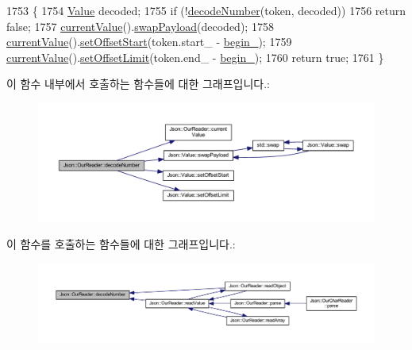 \begin{DoxyCode}
1753                                          \{
1754   \hyperlink{class_json_1_1_value}{Value} decoded;
1755   \textcolor{keywordflow}{if} (!\hyperlink{class_json_1_1_our_reader_a272d271290933a89abfd5096dd69c9e9}{decodeNumber}(token, decoded))
1756     \textcolor{keywordflow}{return} \textcolor{keyword}{false};
1757   \hyperlink{class_json_1_1_our_reader_a2acd5b1d53e7d7e17c21ff8e96edc09d}{currentValue}().\hyperlink{class_json_1_1_value_a5263476047f20e2fc6de470e4de34fe5}{swapPayload}(decoded);
1758   \hyperlink{class_json_1_1_our_reader_a2acd5b1d53e7d7e17c21ff8e96edc09d}{currentValue}().\hyperlink{class_json_1_1_value_a92e32ea0f4f8a15853a3cf0beac9feb9}{setOffsetStart}(token.start\_ - \hyperlink{class_json_1_1_our_reader_a9bda9d72335d52cd06e65f9eca3f70f5}{begin\_});
1759   \hyperlink{class_json_1_1_our_reader_a2acd5b1d53e7d7e17c21ff8e96edc09d}{currentValue}().\hyperlink{class_json_1_1_value_a5e4f5853fec138150c5df6004a8c2bcf}{setOffsetLimit}(token.end\_ - \hyperlink{class_json_1_1_our_reader_a9bda9d72335d52cd06e65f9eca3f70f5}{begin\_});
1760   \textcolor{keywordflow}{return} \textcolor{keyword}{true};
1761 \}
\end{DoxyCode}
이 함수 내부에서 호출하는 함수들에 대한 그래프입니다.\+:\nopagebreak
\begin{figure}[H]
\begin{center}
\leavevmode
\includegraphics[width=350pt]{class_json_1_1_our_reader_a272d271290933a89abfd5096dd69c9e9_cgraph}
\end{center}
\end{figure}
이 함수를 호출하는 함수들에 대한 그래프입니다.\+:\nopagebreak
\begin{figure}[H]
\begin{center}
\leavevmode
\includegraphics[width=350pt]{class_json_1_1_our_reader_a272d271290933a89abfd5096dd69c9e9_icgraph}
\end{center}
\end{figure}
\mbox{\label{class_json_1_1_our_reader_a712270d53a2f023c2f406ac813548340}} 
